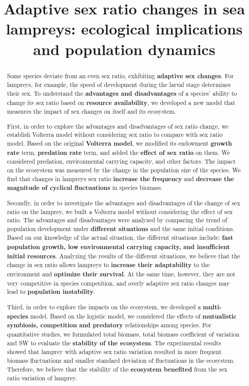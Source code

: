 \documentclass[12pt]{article}  %
\title{Adaptive sex ratio changes in sea lampreys: ecological implications and population dynamics}  %
\begin{document}
	
	\begin{abstract}
		
		Some species deviate from an even sex ratio, exhibiting \textbf{adaptive sex changes}. For lampreys, for example, the speed of development during the larval stage determines their sex. To understand the \textbf{advantages and disadvantages} of a species' ability to change its sex ratio based on \textbf{resource availability}, we developed a new model that measures the impact of sex changes on itself and its ecosystem.
		
		First, in order to explore the advantages and disadvantages of sex ratio change, we establish Volterra model without considering sex ratio to compare with sex ratio model. Based on the original \textbf{Volterra model}, we modified its endowment \textbf{growth rate} term, \textbf{predation rate} term, and added the \textbf{effect of sex ratio} on them. We considered predation, environmental carrying capacity, and other factors. The impact on the ecosystem was measured by the change in the population size of the species. We find that changes in lampreys sex ratio \textbf{increase the frequency} and \textbf{decrease the magnitude of cyclical fluctuations} in species biomass.
		
		Secondly, in order to investigate the advantages and disadvantages of the change of sex ratio on the lamprey, we built a Volterra model without considering the effect of sex ratio. The advantages and disadvantages were analyzed by comparing the trend of population development under \textbf{different situations} and the same initial conditions. Based on our knowledge of the actual situation, the different situations include: \textbf{fast population growth, low environmental carrying capacity, and insufficient initial resources}. Analyzing the results of the different situations, we believe that the change in sex ratio allows lampreys to \textbf{increase their adaptability} to the environment and \textbf{optimize their survival}. At the same time, however, they are not very competitive in species competition, and overly adaptive sex ratio changes may lead to \textbf{population instability}.
		
		Third, in order to explore the impacts on the ecosystem, we developed a \textbf{multi-species} model. Based on the logistic model, we considered the effects of \textbf{mutualistic symbiosis, competition and predatory} relationships among species. For quantitative studies, we formulated total biomass, total biomass coefficient of variation and SW to evaluate the \textbf{stability of the ecosystem}. The experimental results showed that lamprey with adaptive sex ratio variation resulted in more frequent biomass fluctuations and smaller standard deviation of fluctuations in the ecosystem. Therefore, we believe that the stability of the \textbf{ecosystem benefited} from the sex ratio variation of lamprey.
		

\end{abstract}
\end{document}
